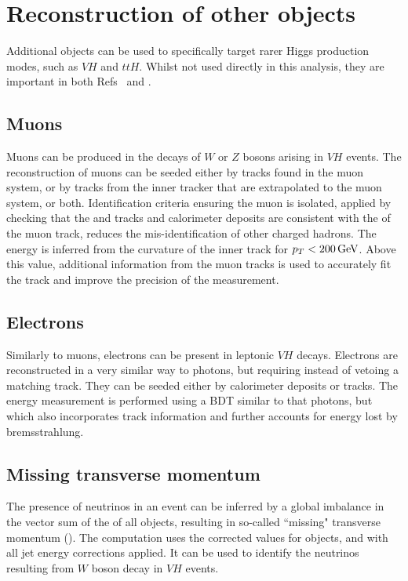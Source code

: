 \section{Reconstruction of other objects}

Additional objects can be used to specifically target rarer Higgs production modes, such as $VH$ and $ttH$.
Whilst not used directly in this analysis, they are important in both Refs~\cite{HIG-16-040} and \cite{HIG-18-018}.

\subsection{Muons}

Muons can be produced in the decays of $W$ or $Z$ bosons arising in $VH$ events.
The reconstruction of muons can be seeded either by tracks found in the muon system, 
or by tracks from the inner tracker that are extrapolated to the muon system, or both.
Identification criteria ensuring the muon is isolated, 
applied by checking that the \pt and tracks and calorimeter deposits are consistent with the \pt of the muon track, 
reduces the mis-identification of other charged hadrons.
The energy is inferred from the curvature of the inner track for $p_T < \SI{200}{GeV}$.
Above this value, additional information from the muon tracks is used to accurately fit the track
and improve the precision of the \pt measurement.


\subsection{Electrons}

Similarly to muons, electrons can be present in leptonic $VH$ decays.
Electrons are reconstructed in a very similar way to photons, but requiring instead of vetoing a matching track.
They can be seeded either by calorimeter deposits or tracks.
The energy measurement is performed using a BDT similar to that photons, 
but which also incorporates track information and further accounts for energy lost by bremsstrahlung.

\subsection{Missing transverse momentum}

The presence of neutrinos in an event can be inferred by a global imbalance in the vector sum of the \pt of all objects, 
resulting in so-called ``missing" transverse momentum (\met).
The \met computation uses the corrected \pt values for objects, and with all jet energy corrections applied.
It can be used to identify the neutrinos resulting from $W$ boson decay in $VH$ events.
